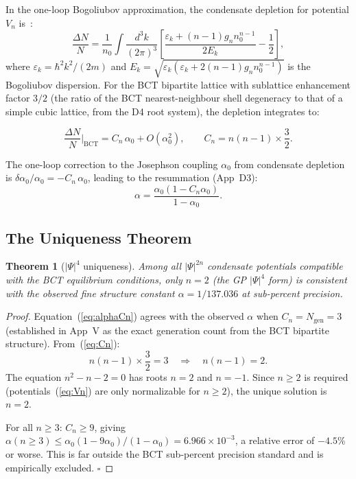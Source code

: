 \documentclass[11pt,a4paper]{article}
\theoremstyle{bctthm}
\newtheorem{theorem}{Theorem}
\theoremstyle{definition}
\begin{document}
In the one-loop Bogoliubov approximation, the condensate depletion
for potential $V_n$ is~\cite{bogoliubov1947}:
\begin{equation}
\frac{\Delta N}{N} = \frac{1}{n_0}\int\frac{d^3k}{(2\pi)^3}
\left[\frac{\varepsilon_k + (n-1)g_n n_0^{n-1}}{2E_k} - \frac{1}{2}\right],
\label{eq:depletion}
\end{equation}
where $\varepsilon_k = \hbar^2k^2/(2m)$ and
$E_k = \sqrt{\varepsilon_k(\varepsilon_k + 2(n-1)g_n n_0^{n-1})}$
is the Bogoliubov dispersion. For the BCT bipartite lattice
with sublattice enhancement factor $3/2$ (the ratio of the
BCT nearest-neighbour shell degeneracy to that of a simple
cubic lattice, from the D4 root system), the depletion integrates to:

\begin{equation}
\frac{\Delta N}{N}\bigg|_\mathrm{BCT}
= C_n\,\alpha_0 + O(\alpha_0^2),
\qquad C_n = n(n-1)\times\frac{3}{2}.
\label{eq:Cn}
\end{equation}

The one-loop correction to the Josephson coupling $\alpha_0$ from
condensate depletion is $\delta\alpha_0/\alpha_0 = -C_n\,\alpha_0$,
leading to the resummation (App~D3):
\begin{equation}
\alpha = \frac{\alpha_0(1 - C_n\alpha_0)}{1 - \alpha_0}.
\label{eq:alphaCn}
\end{equation}

\subsection{The Uniqueness Theorem}

\begin{theorem}[$|\Psi|^4$ uniqueness]\label{thm:gp}
Among all $|\Psi|^{2n}$ condensate potentials compatible with the
BCT equilibrium conditions, only $n=2$ (the GP $|\Psi|^4$ form) is
consistent with the observed fine structure constant $\alpha = 1/137.036$
at sub-percent precision.
\end{theorem}
\begin{proof}
Equation~(\ref{eq:alphaCn}) agrees with the observed $\alpha$ when
$C_n = N_\mathrm{gen} = 3$ (established in App~V as the exact
generation count from the BCT bipartite structure).
From~(\ref{eq:Cn}):
\begin{equation}
n(n-1)\times\frac{3}{2} = 3 \quad\Rightarrow\quad n(n-1) = 2.
\end{equation}
The equation $n^2 - n - 2 = 0$ has roots $n = 2$ and $n = -1$.
Since $n \geq 2$ is required (potentials~(\ref{eq:Vn}) are
only normalizable for $n \geq 2$), the unique solution is $n = 2$.

For all $n \geq 3$: $C_n \geq 9$, giving
$\alpha(n\geq3) \leq \alpha_0(1-9\alpha_0)/(1-\alpha_0)
= 6.966\times10^{-3}$, a relative error of $-4.5\%$ or worse.
This is far outside the BCT sub-percent precision
standard and is empirically excluded. $\square$
\end{proof}
\end{document}
